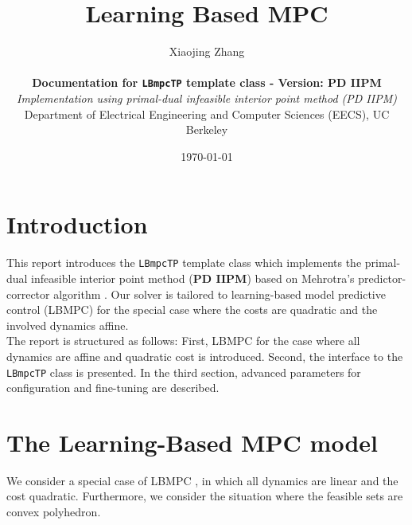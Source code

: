 \documentclass[letter]{article}
\date{\today}
\author{Xiaojing Zhang \\ \\
 	{\bf Documentation for \texttt{LBmpcTP} template class - Version: PD IIPM} \\
 	{\it Implementation using primal-dual infeasible interior point method (PD IIPM)} \\
 	 Department of Electrical Engineering and Computer Sciences (EECS), UC Berkeley}
\title{Learning Based MPC}
\begin{document}
\pagestyle{headings}	%
\maketitle

\begin{sffamily}		%


\newcommand{\sinc}{\mathrm{sinc}}
\renewcommand{\thefootnote}{\fnsymbol{footnote}}

\section*{Introduction}
This report introduces the \texttt{LBmpcTP} template class which implements the primal-dual infeasible interior point method (\textbf{PD IIPM}) based on Mehrotra's predictor-corrector algorithm \citep{Mehrotra1992PDIPM}. Our solver is tailored to  learning-based model predictive control (LBMPC) \citep{Aswani2011LBMPC} for the special case where the costs are quadratic and the involved dynamics affine.\\

\noindent
The report is structured as follows: First, LBMPC for the case where all dynamics are affine and quadratic cost is introduced. Second, the interface to the \texttt{LBmpcTP} class is presented. In the third section, advanced parameters for configuration and fine-tuning are described.

\section{The Learning-Based MPC model}
We consider a special case of LBMPC \citep{Aswani2011LBMPC}, in which all dynamics are linear and the cost quadratic. Furthermore, we consider the situation where the feasible sets are convex polyhedron. \\


\end{sffamily}
\end{document}
